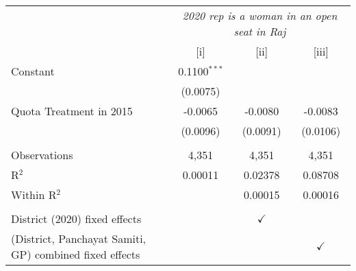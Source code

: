 
\begingroup
\centering
\begin{tabular}{lccc}
   \toprule
    & \multicolumn{3}{c}{\textit{2020 rep is a woman in an open seat in Raj}}\\
                                                           & [i]            & [ii]          & [iii]\\  
   \midrule 
   Constant                                                & 0.1100$^{***}$ &               &   \\   
                                                           & (0.0075)       &               &   \\   
   Quota Treatment in 2015                                 & -0.0065        & -0.0080       & -0.0083\\   
                                                           & (0.0096)       & (0.0091)      & (0.0106)\\   
    \\
   Observations                                            & 4,351          & 4,351         & 4,351\\  
   R$^2$                                                   & 0.00011        & 0.02378       & 0.08708\\  
   Within R$^2$                                            &                & 0.00015       & 0.00016\\  
    \\
   District (2020) fixed effects                           &                & $\checkmark$  & \\  
   (District, Panchayat Samiti, GP) combined fixed effects &                &               & $\checkmark$\\   
   \bottomrule
\end{tabular}
\par\endgroup


